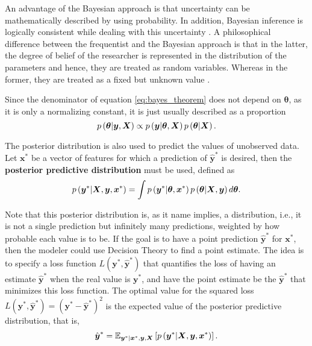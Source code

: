 An advantage of the Bayesian approach is that uncertainty can be mathematically described by using probability. In addition, Bayesian inference is logically consistent while dealing with this uncertainty \cite{cox1946probability} \cite{cox1963algebra} \cite{jaynes2003probability} \cite{o2004advanced}. A philosophical difference between the frequentist and the Bayesian approach is that in the latter, the degree of belief of the researcher is represented in the distribution of the parameters and hence, they are treated as random variables. Whereas in the former, they are treated as a fixed but unknown value \cite{o2004advanced}.

Since the denominator of equation \eqref{eq:bayes_theorem} does not depend on $\boldsymbol{\theta}$, as it is only a normalizing constant, it is just usually described as a proportion
\begin{equation}
  \label{eq:bayes_theorem_prop}
    p\left( \boldsymbol{\theta} | \boldsymbol{y}, \boldsymbol{X} \right) \propto p\left( \boldsymbol{y} | \boldsymbol{\theta}, \boldsymbol{X} \right) p\left( \boldsymbol{\theta} | \boldsymbol{X} \right).
\end{equation}

The posterior distribution is also used to predict the values of unobserved data. Let $\boldsymbol{x}^*$ be a vector of features for which a prediction of $\hat{\boldsymbol{y}}^*$ is desired, then the \textbf{posterior predictive distribution} must be used, defined as
\begin{equation}
  \label{eq:post_pred_dist}
  p\left( \boldsymbol{y}^* | \boldsymbol{X}, \boldsymbol{y}, \boldsymbol{x}^* \right) = \int p\left( \boldsymbol{y}^* | \boldsymbol{\theta}, \boldsymbol{x}^* \right) p\left( \boldsymbol{\theta} | \boldsymbol{X}, \boldsymbol{y} \right) d\boldsymbol{\theta}.
\end{equation}

Note that this posterior distribution is, as it name implies, a distribution, i.e., it is not a single prediction but infinitely many predictions, weighted by how probable each value is to be. If the goal is to have a point prediction $\hat{\boldsymbol{y}}^*$ for $\boldsymbol{x}^*$, then the modeler could use Decision Theory to find a point estimate. The idea is to specify a loss function $L(\boldsymbol{y}^*, \hat{\boldsymbol{y}}^*)$ that quantifies the loss of having an estimate $\hat{\boldsymbol{y}}^*$ when the real value is $\boldsymbol{y}^*$, and have the point estimate be the $\hat{\boldsymbol{y}}^*$ that minimizes this loss function. The optimal value for the squared loss $L(\boldsymbol{y}^*, \hat{\boldsymbol{y}}^*) = (\boldsymbol{y}^* - \hat{\boldsymbol{y}}^*)^2$ is the expected value of the posterior predictive distribution, that is,
\begin{equation}
  \hat{\boldsymbol{y}}^* = \mathbb{E}_{\boldsymbol{y}^* | \boldsymbol{x}^*, \boldsymbol{y}, \boldsymbol{X}} \left[ p\left( \boldsymbol{y}^* | \boldsymbol{X}, \boldsymbol{y}, \boldsymbol{x}^* \right) \right].
\end{equation}

